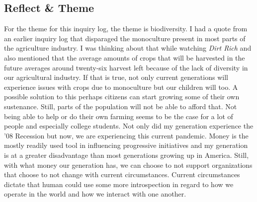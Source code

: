 \documentclass[a4paper,man,biblatex]{apa6}
\begin{document}
\subsection{Reflect \& Theme} For the theme for this inquiry log, the theme is biodiversity. I had a quote from an earlier inquiry log that disparaged the monoculture present in most parts of the agriculture industry. I was thinking about that while watching \textit{Dirt Rich} and \textcite{dirtrich} also mentioned that the average amounts of crops that will be harvested in the future averages around twenty-six harvest left because of the lack of diversity in our agricultural industry. If that is true, not only current generations will experience issues with crops due to monoculture but our children will too. A possible solution to this perhaps citizens can start growing some of their own sustenance. Still, parts of the population will not be able to afford that. Not being able to help or do their own farming seems to be the case for a lot of people and especially college students. Not only did my generation experience the '08 Recession but now, we are experiencing this current pandemic. Money is the mostly readily used tool in influencing progressive initiatives and my generation is at a greater disadvantage than most generations growing up in America. Still, with what money our generation has, we can choose to not support organizations that choose to not change with current circumstances. Current circumstances dictate that human could use some more introspection in regard to how we operate in the world and how we interact with one another. 
\end{document}
